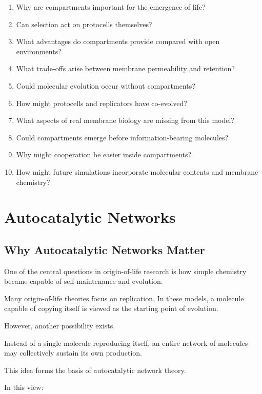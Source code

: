 \documentclass[
  oneside,
  openany]{book}
\providecommand{\tightlist}{%
  \setlength{\itemsep}{0pt}\setlength{\parskip}{0pt}}
\begin{document}
\begin{enumerate}
\def\labelenumi{\arabic{enumi}.}
\tightlist
\item
  Why are compartments important for the emergence of life?
\item
  Can selection act on protocells themselves?
\item
  What advantages do compartments provide compared with open environments?
\item
  What trade-offs arise between membrane permeability and retention?
\item
  Could molecular evolution occur without compartments?
\item
  How might protocells and replicators have co-evolved?
\item
  What aspects of real membrane biology are missing from this model?
\item
  Could compartments emerge before information-bearing molecules?
\item
  Why might cooperation be easier inside compartments?
\item
  How might future simulations incorporate molecular contents and membrane chemistry?
\end{enumerate}

\chapter{Autocatalytic Networks}\label{autocatalytic-networks}

\section{Why Autocatalytic Networks Matter}\label{why-autocatalytic-networks-matter}

One of the central questions in origin-of-life research is how simple chemistry became capable of self-maintenance and evolution.

Many origin-of-life theories focus on replication. In these models, a molecule capable of copying itself is viewed as the starting point of evolution.

However, another possibility exists.

Instead of a single molecule reproducing itself, an entire network of molecules may collectively sustain its own production.

This idea forms the basis of autocatalytic network theory.

In this view:
\end{document}
